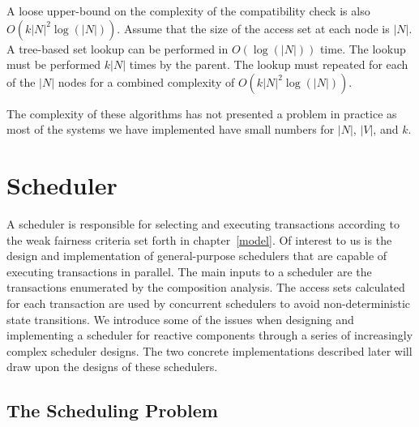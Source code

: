 A loose upper-bound on the complexity of the compatibility check is also $O(k |N|^2 \log (|N|))$.
Assume that the size of the access set at each node is $|N|$.
A tree-based set lookup can be performed in $O(\log(|N|))$ time.
The lookup must be performed $k |N|$ times by the parent.
The lookup must repeated for each of the $|N|$ nodes for a combined complexity of $O(k |N|^2 \log (|N|))$.

The complexity of these algorithms has not presented a problem in practice as most of the systems we have implemented have small numbers for $|N|$, $|V|$, and $k$.

\section{Scheduler}

A scheduler is responsible for selecting and executing transactions according to the weak fairness criteria set forth in chapter~\ref{model}.
Of interest to us is the design and implementation of general-purpose schedulers that are capable of executing transactions in parallel.
The main inputs to a scheduler are the transactions enumerated by the composition analysis.
The access sets calculated for each transaction are used by concurrent schedulers to avoid non-deterministic state transitions.
We introduce some of the issues when designing and implementing a scheduler for reactive components through a series of increasingly complex scheduler designs.
The two concrete implementations described later will draw upon the designs of these schedulers.

\subsection{The Scheduling Problem}
\label{scheduling_problem}

